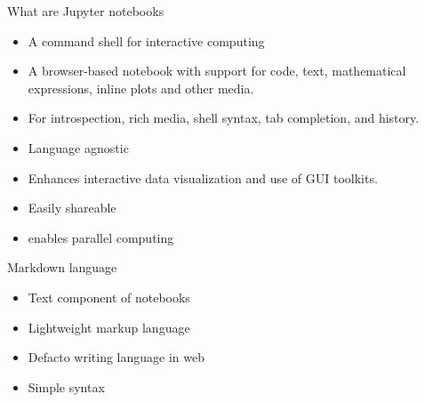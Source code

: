 \begin{frame}{What are Jupyter notebooks}
	\begin{beamerboxesrounded}{}
		\begin{itemize}
			\item A command shell for interactive computing
			\item A browser-based notebook with support for code, text, mathematical expressions, inline plots and other media.
			\item For  introspection, rich media, shell syntax, tab completion, and history.
			\item Language agnostic 
			\item Enhances interactive data visualization and use of GUI toolkits.
			\item Easily shareable 
			\item enables parallel computing 
		\end{itemize}
	\end{beamerboxesrounded}
\end{frame}

\begin{frame}{Markdown language}
	\begin{beamerboxesrounded}{}
		\begin{itemize}
			\item Text component of notebooks
			\item Lightweight markup language
			\item Defacto writing language in web
			\item Simple syntax
		\end{itemize}
	\end{beamerboxesrounded}
\end{frame}

















